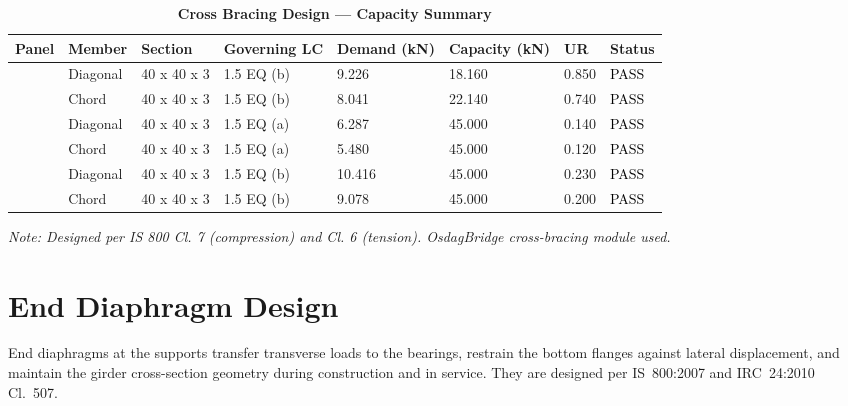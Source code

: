 \documentclass[12pt,a4paper]{report}
\numberwithin{table}{chapter}
\numberwithin{figure}{chapter}
\begin{document}
\vspace{1em}
\begin{longtable}{|C{2.0cm}|L{1.8cm}|C{2.2cm}|C{3.0cm}|C{1.8cm}|C{1.8cm}|C{1.2cm}|C{1.8cm}|}
\caption{\textbf{Cross Bracing Design --- Capacity Summary}}
\hline
\textbf{Panel} & \textbf{Member} & \textbf{Section} & \textbf{Governing LC} & \textbf{Demand (kN)} & \textbf{Capacity (kN)} & \textbf{UR} & \textbf{Status} \\[6pt]
\hline
{} & Diagonal & 40 x 40 x 3 & 1.5 EQ (b) & 9.226 & 18.160 & 0.850 & \textcolor{black}{PASS} \\[6pt]
 & Chord & 40 x 40 x 3 & 1.5 EQ (b) & 8.041 & 22.140 & 0.740 & \textcolor{black}{PASS} \\[6pt]
\hline
{} & Diagonal & 40 x 40 x 3 & 1.5 EQ (a) & 6.287 & 45.000 & 0.140 & \textcolor{black}{PASS} \\[6pt]
 & Chord & 40 x 40 x 3 & 1.5 EQ (a) & 5.480 & 45.000 & 0.120 & \textcolor{black}{PASS} \\[6pt]
\hline
{} & Diagonal & 40 x 40 x 3 & 1.5 EQ (b) & 10.416 & 45.000 & 0.230 & \textcolor{black}{PASS} \\[6pt]
 & Chord & 40 x 40 x 3 & 1.5 EQ (b) & 9.078 & 45.000 & 0.200 & \textcolor{black}{PASS} \\[6pt]
\hline
\end{longtable}
\noindent\textit{Note: Designed per IS 800 Cl. 7 (compression) and Cl. 6 (tension). OsdagBridge cross-bracing module used.}

\section{End Diaphragm Design}
\label{sec:end-diaphragm}

End diaphragms at the supports transfer transverse loads to the bearings, restrain the bottom flanges against lateral displacement, and maintain the girder cross-section geometry during construction and in service. They are designed per IS~800:2007 and IRC~24:2010 Cl.~507.

\vspace{1em}

\vspace{0.4em}
\noindent
\setlength{\tabcolsep}{4pt}
\setlength{\LTleft}{0pt}
\setlength{\LTright}{\fill}
\end{document}

